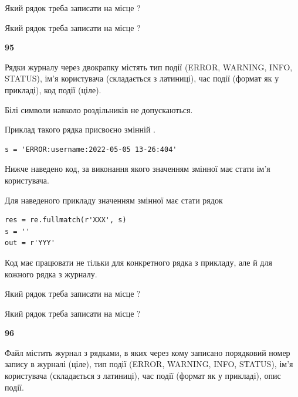 Який рядок треба записати на місце  ?\par
\vspace{5mm}


Який рядок треба записати на місце  ?\par


\newpage

{\begin {center}\textbf{ 95}\end {center}}\par
Рядки журналу через двокрапку містять тип події (ERROR, WARNING, INFO, STATUS), ім'я користувача (складається з латиниці), час події (фор\-мат як у прикладі), код події (ціле).

Білі символи навколо роздільників не допускаються.

Приклад такого рядка присвоєно змінній .



\begin{verbatim}
s = 'ERROR:username:2022-05-05 13-26:404'
\end{verbatim}


Нижче наведено код, за виконання якого значенням змінної  має стати ім'я користувача.

Для наведеного прикладу значенням змінної  має стати рядок 



\begin{verbatim}
res = re.fullmatch(r'XXX', s)
s = ''
out = r'YYY'
\end{verbatim}


Код має працювати не тільки для конкретного рядка з прикладу, але й для кожного рядка з журналу.




Який рядок треба записати на місце  ?\par
\vspace{5mm}


Який рядок треба записати на місце  ?\par


\newpage

{\begin {center}\textbf{ 96}\end {center}}\par
Файл  містить журнал з рядками, в яких через кому записано поряд\-ко\-вий номер запису в журналі (ціле), тип події (ERROR, WARNING, INFO, STATUS), ім'я користувача (складається з латиниці), час події (фор\-мат як у прикладі), опис події.

